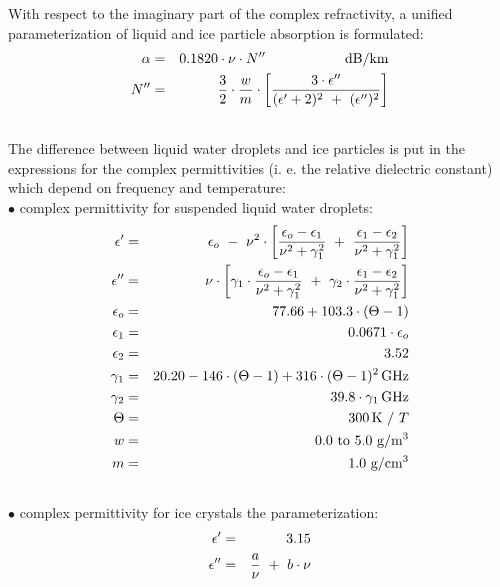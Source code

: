 {With respect to the imaginary part of the complex refractivity, a 
unified parameterization of liquid and ice particle absorption 
is formulated:
\begin{eqnarray}
  \alpha & = & 0.1820 \cdot \nu \cdot\imn\hspace*{20mm}
               \mbox{dB/km}\\
    \imn & = & \frac{3}{2} \cdot \frac{w}{m} \cdot 
               \left[\frac{3\cdot
                   \ime}{(\ree+2)^2~+~(\ime)^2}\right]\nonumber\\
  \nonumber
\end{eqnarray}
%
The difference between liquid water droplets and ice particles is
put in the expressions for the complex permittivities
(i. e. the relative dielectric constant) which depend on frequency and
temperature:\\
$\bullet$ complex permittivity for suspended liquid water droplets:
\begin{eqnarray}
  \ree       & = & \epsilon_o~-~\nu^2\cdot
                   \left[\frac{\epsilon_o-\epsilon_1}{\nu^2+\gamma_1^2}~+~
                   \frac{\epsilon_1-\epsilon_2}{\nu^2+\gamma_1^2}\right]\nonumber\\
%
  \ime       & = & \nu\cdot\left[\gamma_1\cdot
                   \frac{\epsilon_o-\epsilon_1}{\nu^2+\gamma_1^2}~+~
                   \gamma_2\cdot\frac{\epsilon_1-\epsilon_2}{\nu^2+\gamma_1^2}\right]\nonumber\\
%
  \epsilon_o & = & 77.66 + 103.3\cdot(\Theta-1)\nonumber\\
  \epsilon_1 & = & 0.0671\cdot\epsilon_o\nonumber\\
  \epsilon_2 & = & 3.52\nonumber\\
%
  \gamma_1   & = & 20.20 - 146\cdot(\Theta-1) + 316\cdot(\Theta-1)^2\,\mbox{GHz}\nonumber\\
  \gamma_2   & = & 39.8\cdot\gamma_1\,\mbox{GHz}\nonumber\\
%
  \Theta     & = & 300\,\mbox{K}~/~T\nonumber\\
%
  w          & = & 0.0~\mbox{to}~5.0~\mbox{g}/\mbox{m}^3 \nonumber\\
  m          & = & 1.0~\mbox{g}/\mbox{cm}^3\nonumber\\
  \nonumber
\end{eqnarray}
$\bullet$ complex permittivity for ice crystals the parameterization:
\begin{eqnarray}
  \ree    & = & 3.15\nonumber\\
%
  \ime    & = & \frac{a}{\nu}~+~b\cdot\nu\nonumber\\

\end{eqnarray}}
